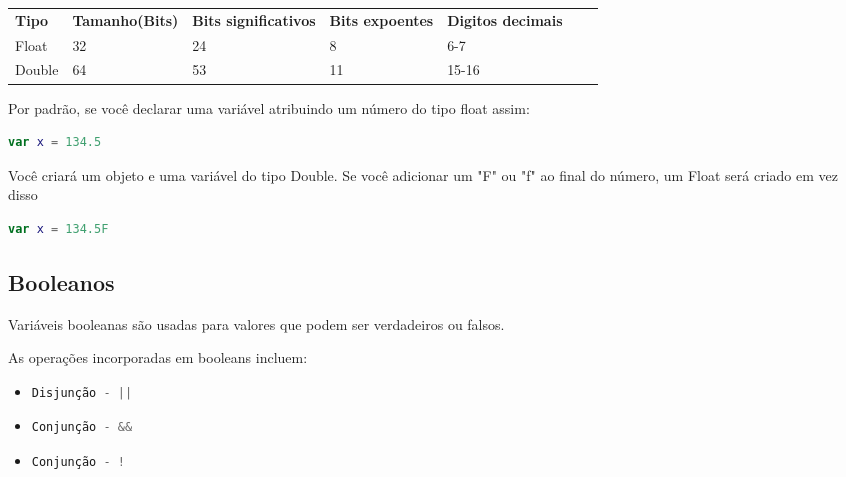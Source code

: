     \begin{tabular}{p{1cm} p{2.5cm} p{3.0cm} p{3.0cm} p{3.5cm} cp{2cm}}
      
      \textbf{Tipo} \centering & \textbf{Tamanho(Bits)} & \textbf{Bits significativos} & \textbf{Bits expoentes} & \textbf{Digitos decimais} \\ 
          Float \centering     & 32  \centering         &  24    & 8              & 6-7 \\
          Double \centering    & 64  \centering         &  53  & 11       &15-16  \\
      \end{tabular}
      Por padrão, se você declarar uma variável 
      atribuindo um número do tipo float assim:
      \begin{lstlisting}[label={lst:example1}, language=Kotlin]
      var x = 134.5 
      \end{lstlisting}
      Você criará um objeto e uma variável do tipo Double.
      Se você adicionar um "F" ou "f" ao final do número, 
      um Float será criado em vez disso
      \begin{lstlisting}[label={lst:example1}, language=Kotlin]
      var x = 134.5F 
      \end{lstlisting}
   
      \subsection{Booleanos}
      Variáveis booleanas são usadas para valores que podem 
      ser verdadeiros ou falsos. 

      As operações incorporadas em booleans incluem:
      \begin{itemize}
      \item
      \begin{lstlisting}[label={lst:example1}, language=Kotlin]
Disjunção - ||
      \end{lstlisting}

      \item
      \begin{lstlisting}[label={lst:example1}, language=Kotlin]
Conjunção - &&
      \end{lstlisting}

      \item
      \begin{lstlisting}[label={lst:example1}, language=Kotlin]
Conjunção - !
      \end{lstlisting}
      \end{itemize}
      

